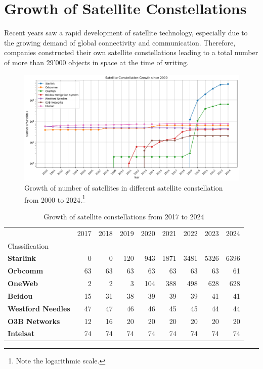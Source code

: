 \section{Growth of Satellite Constellations} \label{sec:satellite-constellations}

Recent years saw a rapid development of satellite technology, especially due to the growing demand of global connectivity and communication.
Therefore, companies constructed their own satellite constellations leading to a total number of more than 29'000 objects in space at the time of writing.

\begin{figure}[ht]
	\includegraphics[width=\textwidth]{./chapters/4-results/satellites/img/sattelite-dev.png}
	\caption{Growth of number of satellites in different satellite constellation from 2000 to 2024.\footnote{Note the logarithmic scale.}}
	\label{fig:growth-satellite-constellations}
\end{figure}

\begin{table}
	\caption{Growth of satellite constellations from 2017 to 2024}
	\label{fig:satellite-constellations-short}
	\begin{tabular}{lrrrrrrrr}
		\toprule
		                          & 2017 & 2018 & 2019 & 2020 & 2021 & 2022 & 2023 & 2024 \\
		Classification            &      &      &      &      &      &      &      &      \\
		\midrule
		\textbf{Starlink}         & 0    & 0    & 120  & 943  & 1871 & 3481 & 5326 & 6396 \\
		\textbf{Orbcomm}          & 63   & 63   & 63   & 63   & 63   & 63   & 63   & 61   \\
		\textbf{OneWeb}           & 2    & 2    & 3    & 104  & 388  & 498  & 628  & 628  \\
		\textbf{Beidou}           & 15   & 31   & 38   & 39   & 39   & 39   & 41   & 41   \\
		\textbf{Westford Needles} & 47   & 47   & 46   & 46   & 45   & 45   & 44   & 44   \\
		\textbf{O3B Networks}     & 12   & 16   & 20   & 20   & 20   & 20   & 20   & 20   \\
		\textbf{Intelsat}         & 74   & 74   & 74   & 74   & 74   & 74   & 74   & 74   \\
		\bottomrule
	\end{tabular}
\end{table}


